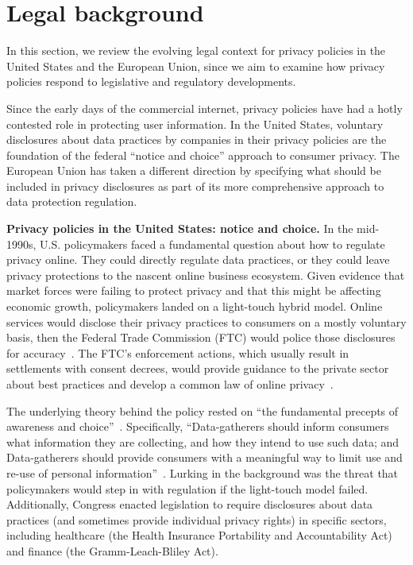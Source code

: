 {\section{Legal background}
\label{sec:background}

In this section, we review the evolving legal context for privacy policies in the United States and the European Union, since we aim to examine how privacy policies respond to legislative and regulatory developments. 

Since the early days of the commercial internet, privacy policies have had a hotly contested role in protecting user information. In the United States, voluntary disclosures about data practices by companies in their privacy policies are the foundation of the federal ``notice and choice'' approach to consumer privacy. The European Union has taken a different direction by specifying what should be included in privacy disclosures as part of its more comprehensive approach to data protection regulation. 

\textbf{Privacy policies in the United States: notice and choice.} In the mid-1990s, U.S. policymakers faced a fundamental question about how to regulate privacy online. They could directly regulate data practices, or they could leave privacy protections to the nascent online business ecosystem. Given evidence that market forces were failing to protect privacy and that this might be affecting economic growth, policymakers landed on a light-touch hybrid model. Online services would disclose their privacy practices to consumers on a mostly voluntary basis, then the Federal Trade Commission (FTC) would police those disclosures for accuracy~\cite{swire1997markets}. The FTC’s enforcement actions, which usually result in settlements with consent decrees, would provide guidance to the private sector about best practices and develop a common law of online privacy~\cite{solove2014ftc}.

The underlying theory behind the policy rested on ``the fundamental precepts of awareness and choice''~\cite{united1997framework}. Specifically, ``Data-gatherers should inform consumers what information they are collecting, and how they intend to use such data; and Data-gatherers should provide consumers with a meaningful way to limit use and re-use of personal information''~\cite{united1997framework}. Lurking in the background was the threat that policymakers would step in with regulation if the light-touch model failed. Additionally, Congress enacted legislation to require disclosures about data practices (and sometimes provide individual privacy rights) in specific sectors, including healthcare (the Health Insurance Portability and Accountability Act) and finance (the Gramm-Leach-Bliley Act).

}

